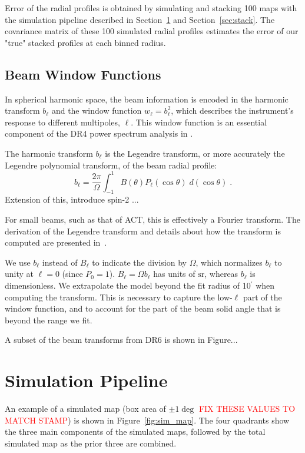 Error of the radial profiles is obtained by simulating and stacking 100 maps with the simulation pipeline described in Section~\ref{sec:sim_pipe} and Section~\ref{sec:stack}.  The covariance matrix of these 100 simulated radial profiles estimates the error of our "true" stacked profiles at each binned radius.

\subsection{Beam Window Functions}
\label{subsec:window}
In spherical harmonic space, the beam information is encoded in the harmonic transform $b_{\ell}$ and the window function $w_{\ell} = b_{\ell}^2$, which describes the instrument's response to different multipoles, $\ell$. This window function is an essential component of the DR4 power spectrum analysis in \cite{choi_2020}.

The harmonic transform $b_{\ell}$ is the Legendre transform, or more accurately the Legendre polynomial transform, of the beam radial profile:
\begin{equation}
b_{\ell} = \frac{2\pi}{\Omega}\int_{-1}^{1} B(\theta)P_{\ell}(\cos\theta)\; d(\cos\theta) \; .
\label{eq:legendre}
\end{equation}
Extension of this, introduce spin-2 ...

For small beams, such as that of ACT, this is effectively a Fourier transform. The derivation of the Legendre transform and details about how the transform is computed are presented in~\cite{Lungu_2022}.

We use $b_{\ell}$ instead of $B_{\ell}$ to indicate the division by $\Omega$, which normalizes $b_{\ell}$ to unity at $\ell = 0$ (since $P_0 = 1$). $B_{\ell} = \Omega b_{\ell}$ has units of $\mathrm{sr}$, whereas $b_{\ell}$ is dimensionless. We extrapolate the model beyond the fit radius of 10$^{\prime}$ when computing the transform.
This is necessary to capture the low-$\ell$ part of the window function, and to account for the part of the beam solid angle that is beyond the range we fit.

A subset of the beam transforms from DR6 is shown in Figure... 

\section{Simulation Pipeline}
\label{sec:sim_pipe}
An example of a simulated map (box area of $\pm1\deg$ \textcolor{red}{FIX THESE VALUES TO MATCH STAMP}) is shown in Figure~\ref{fig:sim_map}.  The four quadrants show the three main components of the simulated maps, followed by the total simulated map as the prior three are combined.
